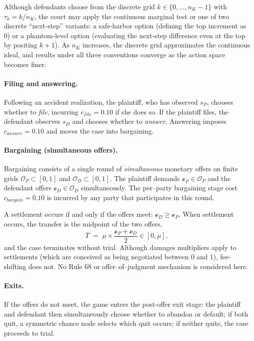 \documentclass{article}
\begin{document}
Although defendants choose from the discrete grid $k\in\{0,\dots,n_K-1\}$ with $\tau_k=k/n_K$, the court may apply the continuous marginal test or one of two discrete “next‑step” variants: a safe‑harbor option (defining the top increment as $0$) or a phantom‑level option (evaluating the next‑step difference even at the top by positing $k+1$). As $n_K$ increases, the discrete grid approximates the continuous ideal, and results under all three conventions converge as the action space becomes finer.

\paragraph{Filing and answering.}
Following an accident realization, the plaintiff, who has observed $s_P$, chooses whether to \emph{file}, incurring $c_{file}=0.10$ if she does so. If the plaintiff files, the defendant observes $s_D$ and chooses whether to \emph{answer}. Answering imposes $c_{answer}=0.10$ and moves the case into bargaining. 

\paragraph{Bargaining (simultaneous offers).}
Bargaining consists of a single round of \emph{simultaneous} monetary offers on finite grids $\mathcal{O}_P\subset[0,1]$ and $\mathcal{O}_D\subset[0,1]$. The plaintiff demands $\mathcal{o}_P\in\mathcal{O}_P$ and the defendant offers $\mathcal{o}_D\in\mathcal{O}_D$ simultaneously. The per–party bargaining stage cost $c_{bargain}=0.10$ is incurred by any party that participates in this round.

A settlement occurs if and only if the offers meet: $\mathcal{o}_D\ge \mathcal{o}_P$. When settlement occurs, the transfer is the midpoint of the two offers,
\[
T \;=\; \mu \times \frac{\mathcal{o}_P+\mathcal{o}_D}{2}\in[0,\mu],
\]
and the case terminates without trial. Although damages multipliers apply to settlements (which are conceived as being negotiated between $0$ and $1$), fee-shifting does not. No Rule 68 or offer–of–judgment mechanism is considered here. 

\paragraph{Exits.}
If the offers do not meet, the game enters the post-offer exit stage: the plaintiff and defendant then simultaneously choose whether to abandon or default; if both quit, a symmetric chance node selects which quit occurs; if neither quits, the case proceeds to trial.
\end{document}
